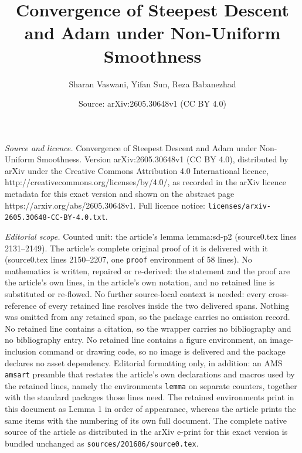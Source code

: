 \documentclass[10pt,a4paper]{amsart}
\title{Convergence of Steepest Descent and Adam under Non-Uniform Smoothness}
\author{Sharan Vaswani, Yifan Sun, Reza Babanezhad}
\date{Source: arXiv:2605.30648v1 (CC BY 4.0)}
\begin{document}
\maketitle

\noindent\emph{Source and licence.} Convergence of Steepest Descent and Adam under Non-Uniform Smoothness. Version arXiv:2605.30648v1 (CC BY 4.0), distributed by arXiv under the Creative Commons Attribution 4.0 International licence, http://creativecommons.org/licenses/by/4.0/, as recorded in the arXiv licence metadata for this exact version and shown on the abstract page https://arxiv.org/abs/2605.30648v1. Full licence notice: \texttt{licenses/arxiv-2605.30648-CC-BY-4.0.txt}.\par\smallskip

\noindent\textit{Editorial scope.} Counted unit: the article's lemma lemma:sd-p2 (source0.tex lines 2131--2149). The article's complete original proof of it is delivered with it (source0.tex lines 2150--2207, one \texttt{proof} environment of 58 lines). No mathematics is written, repaired or re-derived: the statement and the proof are the article's own lines, in the article's own notation, and no retained line is substituted or re-flowed.  No further source-local context is needed: every cross-reference of every retained line resolves inside the two delivered spans.  Nothing was omitted from any retained span, so the package carries no omission record.  No retained line contains a citation, so the wrapper carries no bibliography and no bibliography entry.  No retained line contains a figure environment, an image-inclusion command or drawing code, so no image is delivered and the package declares no asset dependency.  Editorial formatting only, in addition: an AMS \texttt{amsart} preamble that restates the article's own declarations and macros used by the retained lines, namely the environments \texttt{lemma} on separate counters, together with the standard packages those lines need.  The retained environments print in this document as Lemma 1 in order of appearance, whereas the article prints the same items with the numbering of its own full document.  The complete native source of the article as distributed in the arXiv e-print for this exact version is bundled unchanged as \texttt{sources/201686/source0.tex}.
\end{document}

